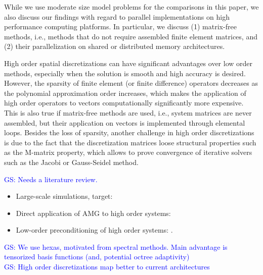 \documentclass[smallcondensed,final]{svjour3}     %
\newcommand{\gsnote}[1]{\textcolor{blue}{GS: #1}}
\begin{document}
While we use moderate size model problems for the comparisons in this
paper, we also discuss our findings with regard to parallel
implementations on high performance computing platforms.  In
particular, we discuss (1) matrix-free methods, i.e., methods that do
not require assembled finite element matrices, and (2) their
parallelization on shared or distributed memory architectures.

High order spatial discretizations can have significant advantages
over low order methods, especially when the solution is smooth and
high accuracy is desired. However, the sparsity of finite element (or
finite difference) operators decreases as the polynomial approximation
order increases, which makes the application of high order operators
to vectors computationally significantly more expensive. This is also
true if matrix-free methods are used, i.e., system matrices are never
assembled, but their application on vectors is implemented through
elemental loops.  Besides the loss of sparsity, another challenge in
high order discretizations is due to the fact that the discretization
matrices loose structural properties such as the M-matrix property,
which allows to prove convergence of iterative solvers such as the
Jacobi or Gauss-Seidel method.

\noindent
\gsnote{Needs a literature review.}\\

\begin{itemize}

\item Large-scale simulations, target:
\cite{SundarBirosBursteddeEtAl12}

\item Direct application of AMG to high order systems:
\cite{HeysManteuffelMcCormickEtAl05}

\item Low-order preconditioning of high order systems:
\cite{Brown10,Kim07,DevilleMund90,HeysManteuffelMcCormickEtAl05}.

\end{itemize}

\noindent
\gsnote{We use hexas, motivated from spectral methods. Main
  advantage is tensorized basis functions (and, potential octree adaptivity)}\\
\gsnote{High order discretizations map better to current architectures}
\end{document}
